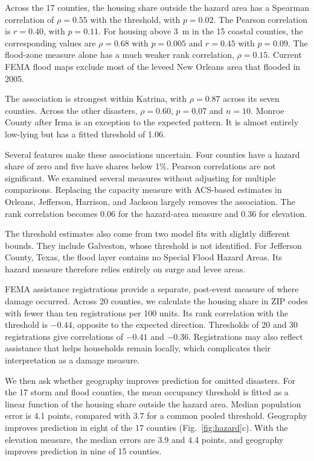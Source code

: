 \documentclass[11pt]{article}
\begin{document}
Across the 17 counties, the housing share outside the hazard area has a Spearman correlation of $\rho=0.55$ with the threshold, with $p=0.02$. The Pearson correlation is $r=0.40$, with $p=0.11$. For housing above 3~m in the 15 coastal counties, the corresponding values are $\rho=0.68$ with $p=0.005$ and $r=0.45$ with $p=0.09$. The flood-zone measure alone has a much weaker rank correlation, $\rho=0.15$. Current FEMA flood maps exclude most of the leveed New Orleans area that flooded in 2005.

The association is strongest within Katrina, with $\rho=0.87$ across its seven counties. Across the other disasters, $\rho=0.60$, $p=0.07$ and $n=10$. Monroe County after Irma is an exception to the expected pattern. It is almost entirely low-lying but has a fitted threshold of 1.06.

Several features make these associations uncertain. Four counties have a hazard share of zero and five have shares below 1\%. Pearson correlations are not significant. We examined several measures without adjusting for multiple comparisons. Replacing the capacity measure with ACS-based estimates in Orleans, Jefferson, Harrison, and Jackson largely removes the association. The rank correlation becomes 0.06 for the hazard-area measure and 0.36 for elevation.

The threshold estimates also come from two model fits with slightly different bounds. They include Galveston, whose threshold is not identified. For Jefferson County, Texas, the flood layer contains no Special Flood Hazard Areas. Its hazard measure therefore relies entirely on surge and levee areas.

FEMA assistance registrations provide a separate, post-event measure of where damage occurred. Across 20 counties, we calculate the housing share in ZIP codes with fewer than ten registrations per 100 units. Its rank correlation with the threshold is $-0.44$, opposite to the expected direction. Thresholds of 20 and 30 registrations give correlations of $-0.41$ and $-0.36$. Registrations may also reflect assistance that helps households remain locally, which complicates their interpretation as a damage measure.

We then ask whether geography improves prediction for omitted disasters. For the 17 storm and flood counties, the mean occupancy threshold is fitted as a linear function of the housing share outside the hazard area. Median population error is 4.1 points, compared with 3.7 for a common pooled threshold. Geography improves prediction in eight of the 17 counties (Fig.~\ref{fig:hazard}c). With the elevation measure, the median errors are 3.9 and 4.4 points, and geography improves prediction in nine of 15 counties.
\end{document}
